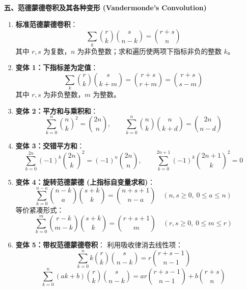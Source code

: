 \textbf{五、范德蒙德卷积及其各种变形 (Vandermonde's Convolution)}
\begin{enumerate}
    \item \textbf{标准范德蒙德卷积}：
    \[
    \sum_{k} \binom{r}{k} \binom{s}{n-k} = \binom{r+s}{n}
    \]
    其中 $r,s$ 为复数，$n$ 为非负整数；求和遍历使两项下指标非负的整数 $k$。
    \item \textbf{变体 1：下指标差为定值}：
    \[
    \sum_{k} \binom{r}{k} \binom{s}{k+m} = \binom{r+s}{r+m} = \binom{r+s}{s-m}
    \]
    其中 $r,s$ 为非负整数，$m$ 为整数。
    \item \textbf{变体 2：平方和与乘积和}：
    \[
    \sum_{k=0}^n \binom{n}{k}^2 = \binom{2n}{n}, \qquad \sum_{k=0}^n \binom{n}{k} \binom{n}{k+d} = \binom{2n}{n-d}
    \]
    \item \textbf{变体 3：交错平方和}：
    \[
    \sum_{k=0}^{2n} (-1)^k \binom{2n}{k}^2 = (-1)^n \binom{2n}{n}, \qquad \sum_{k=0}^{2n+1} (-1)^k \binom{2n+1}{k}^2 = 0
    \]
    \item \textbf{变体 4：旋转范德蒙德 (上指标自变量求和)}：
    \[
    \sum_{k=0}^{n-a} \binom{n-k}{a} \binom{s+k}{k} = \binom{n+s+1}{n-a}
    \quad (n,s\ge 0,\ 0\le a\le n)
    \]
    等价紧凑形式：
    \[
    \sum_{k=0}^{m} \binom{r-k}{m-k} \binom{s+k}{k} = \binom{r+s+1}{m}
    \quad (r,s\ge 0,\ 0\le m\le r)
    \]
    \item \textbf{变体 5：带权范德蒙德卷积}：
    利用吸收律消去线性项：
    \[
    \sum_{k=0}^n k \binom{r}{k} \binom{s}{n-k} = r \binom{r+s-1}{n-1}
    \]
    \[
    \sum_{k=0}^n (ak + b) \binom{r}{k} \binom{s}{n-k} = a r \binom{r+s-1}{n-1} + b \binom{r+s}{n}
    \]
\end{enumerate}

